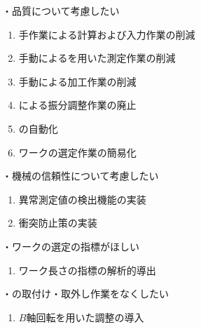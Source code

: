 \clearpage
・品質について考慮したい
\begin{enumerate}[label=\sarrow]
\item 手作業による計算および入力作業の削減
\item 手動による\TouchSensorProbe を用いた測定作業の削減
\item 手動による加工作業の削減
\item \Spacer による振分調整作業の廃止
\item \CurvedOutcutMilling の自動化
\item ワーク\FixtureBolt の選定作業の簡易化
\end{enumerate}



・機械の信頼性について考慮したい
\begin{enumerate}[label=\sarrow]
\item 異常測定値の検出機能の実装
\item 衝突防止策の実装
\end{enumerate}



・ワーク\FixtureBolt の選定の指標がほしい
\begin{enumerate}[label=\sarrow]
\item ワーク\FixtureBolt 長さの指標の解析的導出
\end{enumerate}
・\Spacer の取付け・取外し作業をなくしたい
\begin{enumerate}[label=\sarrow]
\item $B$軸回転を用いた\AlocationLength 調整の導入
\end{enumerate}




